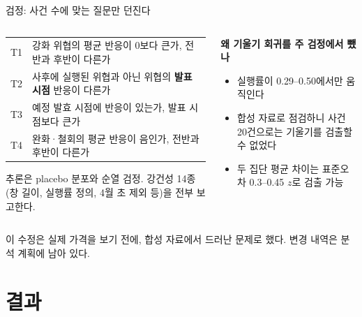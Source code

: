 \documentclass[aspectratio=169,9pt,t]{beamer}
\newcommand{\takeaway}[1]{%
  \par\vfill
  \noindent{\color{navy}\vrule width 1.6pt}\hspace{2.6mm}%
  \begin{minipage}[c]{\dimexpr\linewidth-5mm\relax}\small\linespread{1.15}\selectfont\RaggedRight #1\end{minipage}\par\vspace{1.2mm}}
\newcommand{\lab}[1]{{\small\bfseries\color{navy}#1}}
\newcommand{\tf}{\fontsize{8.2}{10.4}\selectfont}
\begin{document}
\begin{frame}{검정: 사건 수에 맞는 질문만 던진다}
\begin{columns}[T,onlytextwidth]
\begin{column}{0.56\textwidth}
\begingroup\tf
\begin{tabularx}{\linewidth}{@{}lY@{}}
\toprule
T1 & 강화 위협의 평균 반응이 0보다 큰가, 전반과 후반이 다른가\\
T2 & 사후에 실행된 위협과 아닌 위협의 \textbf{발표 시점} 반응이 다른가\\
T3 & 예정 발효 시점에 반응이 있는가, 발표 시점보다 큰가\\
T4 & 완화·철회의 평균 반응이 음인가, 전반과 후반이 다른가\\
\bottomrule
\end{tabularx}\endgroup
\vspace{1.5mm}
{\small\RaggedRight 추론은 placebo 분포와 순열 검정. 강건성 14종(창 길이, 실행률 정의, 4월 초 제외 등)을 전부 보고한다.\par}
\end{column}
\begin{column}{0.4\textwidth}
\lab{왜 기울기 회귀를 주 검정에서 뺐나}
\begin{itemize}
\item 실행률이 0.29--0.50에서만 움직인다
\item 합성 자료로 점검하니 사건 20건으로는 기울기를 검출할 수 없었다
\item 두 집단 평균 차이는 표준오차 0.3--0.45 $z$로 검출 가능
\end{itemize}
\end{column}
\end{columns}
\takeaway{이 수정은 실제 가격을 보기 전에, 합성 자료에서 드러난 문제로 했다. 변경 내역은 분석 계획에 남아 있다.}
\end{frame}

\section{결과}
\end{document}
